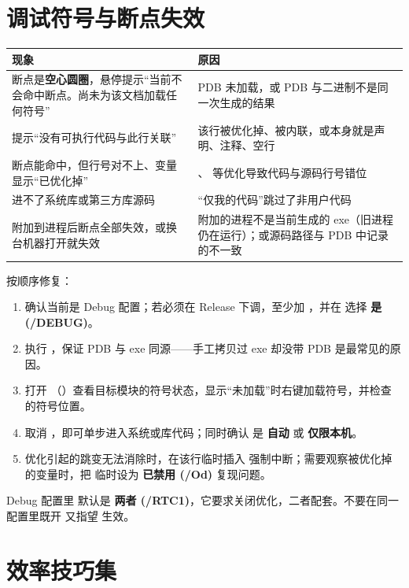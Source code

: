 \section{调试符号与断点失效}
\begin{longtable}{L{6.4cm}L{8.4cm}}
\toprule
\textbf{现象} & \textbf{原因} \\
\midrule
断点是\textbf{空心圆圈}，悬停提示“当前不会命中断点。尚未为该文档加载任何符号” & PDB 未加载，或 PDB 与二进制不是同一次生成的结果 \\
提示“没有可执行代码与此行关联” & 该行被优化掉、被内联，或本身就是声明、注释、空行 \\
断点能命中，但行号对不上、变量显示“已优化掉” & 、 等优化导致代码与源码行号错位 \\
进不了系统库或第三方库源码 & “仅我的代码”跳过了非用户代码 \\
附加到进程后断点全部失效，或换台机器打开就失效 & 附加的进程不是当前生成的 exe（旧进程仍在运行）；或源码路径与 PDB 中记录的不一致 \\
\bottomrule
\end{longtable}
按顺序修复：
\begin{enumerate}
  \item 确认当前是 Debug 配置；若必须在 Release 下调，至少加 ，并在  选择 \textbf{是 (/DEBUG)}。
  \item 执行 ，保证 PDB 与 exe 同源——手工拷贝过 exe 却没带 PDB 是最常见的原因。
  \item 打开 （）查看目标模块的符号状态，显示“未加载”时右键加载符号，并检查  的符号位置。
  \item 取消 ，即可单步进入系统或库代码；同时确认  是 \textbf{自动} 或 \textbf{仅限本机}。
  \item 优化引起的跳变无法消除时，在该行临时插入  强制中断；需要观察被优化掉的变量时，把  临时设为 \textbf{已禁用 (/Od)} 复现问题。
\end{enumerate}
\begin{warnbox}[注意]
Debug 配置里  默认是 \textbf{两者 (/RTC1)}，它要求关闭优化，二者配套。不要在同一配置里既开  又指望  生效。
\end{warnbox}
\section{效率技巧集}

